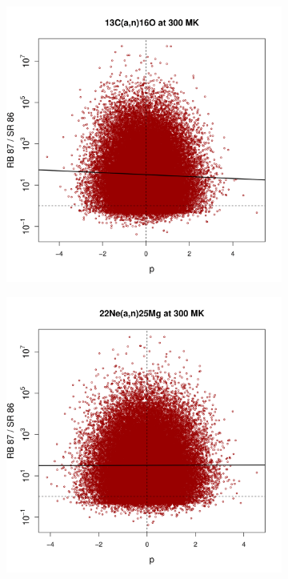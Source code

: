 \begin{figure}[!p]
\centering
\begin{subfigure}[b]{0.495\textwidth}
\centering
\includegraphics[width=\textwidth]{Chapter-3/figs/CorrRB87SR86_13C_a_n_16O_300MK.png}  
\end{subfigure}
\hfill
\begin{subfigure}[b]{0.495\textwidth}  
\centering 
\includegraphics[width=\textwidth]{Chapter-3/figs/CorrRB87SR86_22Ne_a_n_25Mg_300MK.png}

\end{subfigure}
\end{figure}
